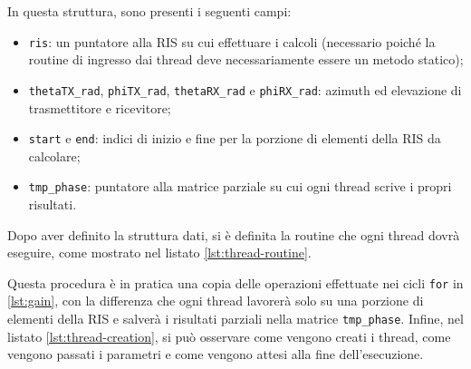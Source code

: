 \vspace{1em}

\vspace{1em}

In questa struttura, sono presenti i seguenti campi:

\begin{itemize}
  \item \texttt{ris}: un puntatore alla RIS su cui effettuare i calcoli (necessario
    poiché la routine di ingresso dai thread deve necessariamente essere un
    metodo statico);

  \item \texttt{thetaTX\_rad}, \texttt{phiTX\_rad}, \texttt{thetaRX\_rad} e
    \texttt{phiRX\_rad}: azimuth ed elevazione di trasmettitore e ricevitore;

  \item \texttt{start} e \texttt{end}: indici di inizio e fine per la porzione
    di elementi della RIS da calcolare;

  \item \texttt{tmp\_phase}: puntatore alla matrice parziale su cui ogni thread scrive
    i propri risultati.
\end{itemize}

Dopo aver definito la struttura dati, si è definita la routine che ogni thread
dovrà eseguire, come mostrato nel listato \ref{lst:thread-routine}.

\vspace{1em}

\vspace{1em}

Questa procedura è in pratica una copia delle operazioni effettuate nei cicli
\texttt{for} in \ref{lst:gain}, con la differenza che ogni thread lavorerà solo
su una porzione di elementi della RIS e salverà i risultati parziali nella
matrice \texttt{tmp\_phase}. Infine, nel listato \ref{lst:thread-creation}, si
può osservare come vengono creati i thread, come vengono passati i parametri e come
vengono attesi alla fine dell'esecuzione.

\vspace{1em}


